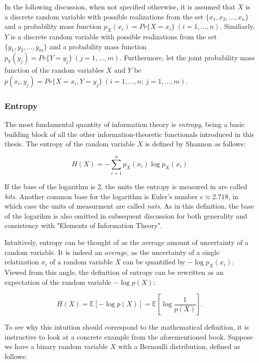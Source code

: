 \documentclass[12pt]{article}
\begin{document}
In the following discussion, when not specified otherwise, it is assumed that $X$ is a discrete random variable with possible realizations from the set $\{x_1, x_2, ..., x_n\}$ and a probability mass function $p_X(x_i) = Pr\{X = x_i\} \ (i = 1, ..., n)$. Similiarly, $Y$ is a discrete random variable with possible realizations from the set $\{y_1, y_2, ..., y_m\}$ and a probability mass function $p_Y(y_j) = Pr\{Y = y_j\} \ (j = 1, ..., m)$. Furthermore, let the joint probability mass function of the random variables $X$ and $Y$ be $p(x_i, y_j) = Pr\{X = x_i, Y = y_j\} \ (i = 1, ..., n; \ j = 1, ..., m)$. 

\subsubsection{Entropy}

The most fundamental quantity of information theory is \textit{entropy}, being a basic building block of all the other information-theoretic functionals introduced in this thesis. The entropy of the random variable $X$ is defined by Shannon \cite{shannon} as follows: 

\begin{equation}
H(X) = -\sum_{i=1}^{n} p_X(x_i) \log p_X(x_i)
\label{eq:entropy}
\end{equation}

If the base of the logarithm is 2, the units the entropy is measured in are called \textit{bits}. Another common base for the logarithm is Euler's number $e \approx 2.718$, in which case the units of measurment are called \textit{nats}. As in this definition, the base of the logarihm is also omitted in subsequent discussion for both generality and consistency with "Elements of Information Theory".

Intuitively, entropy can be thought of as the average amount of uncertainty of a random variable. It is indeed an \textit{average}, as the uncertainty of a single relatization $x_i$ of a random variable $X$ can be quantified by $-\log p_X(x_i)$. Viewed from this angle, the definition of entropy can be rewritten as an expectation of the random variable $-\log p(X)$: 

$$H(X) = \mathbb{E} \left[ - \log p(X) \right] = \mathbb{E} \left[ \log \frac{1}{p(X)} \right].$$

To see why this intuition should correspond to the mathematical definition, it is instructive to look at a concrete example from the aforementioned book. Suppose we have a binary random variable $X$ with a Bernoulli distribution, defined as follows: 
\end{document}
